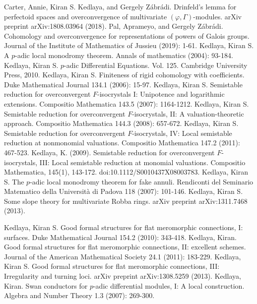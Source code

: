 \documentclass[12pt]{amsart}
\theoremstyle{definition}
\numberwithin{equation}{section}
\begin{document}
\newpage








\begin{thebibliography}{10}
 Carter, Annie, Kiran S. Kedlaya, and Gergely Z\'abr\'adi. Drinfeld's lemma for perfectoid spaces and overconvergence of multivariate $(\varphi,\Gamma) $-modules. arXiv preprint arXiv:1808.03964 (2018).
 Pal, Aprameyo, and Gergely Z\'abr\'adi. Cohomology and overconvergence for representations of powers of Galois groups. Journal of the Institute of Mathematics of Jussieu (2019): 1-61.
 Kedlaya, Kiran S. A $p$-adic local monodromy theorem. Annals of mathematics (2004): 93-184.
 Kedlaya, Kiran S. $p$-adic Differential Equations. Vol. 125. Cambridge University Press, 2010.
 Kedlaya, Kiran S. Finiteness of rigid cohomology with coefficients. Duke Mathematical Journal 134.1 (2006): 15-97.
 Kedlaya, Kiran S. Semistable reduction for overconvergent $F$-isocrystals I: Unipotence and logarithmic extensions. Compositio Mathematica 143.5 (2007): 1164-1212.
 Kedlaya, Kiran S. Semistable reduction for overconvergent $F$-isocrystals, II: A valuation-theoretic approach. Compositio Mathematica 144.3 (2008): 657-672.
 Kedlaya, Kiran S. Semistable reduction for overconvergent $F$-isocrystals, IV: Local semistable reduction at nonmonomial valuations. Compositio Mathematica 147.2 (2011): 467-523.
 Kedlaya, K. (2009). Semistable reduction for overconvergent $F$-isocrystals, III: Local semistable reduction at monomial valuations. Compositio Mathematica, 145(1), 143-172. doi:10.1112/S0010437X08003783.
 Kedlaya, Kiran S. The $p$-adic local monodromy theorem for fake annuli. Rendiconti del Seminario Matematico della Universit\`a di Padova 118 (2007): 101-146.
 Kedlaya, Kiran S. Some slope theory for multivariate Robba rings. arXiv preprint arXiv:1311.7468 (2013).

 Kedlaya, Kiran S. Good formal structures for flat meromorphic connections, I: surfaces. Duke Mathematical Journal 154.2 (2010): 343-418.
 Kedlaya, Kiran. Good formal structures for flat meromorphic connections, II: excellent schemes. Journal of the American Mathematical Society 24.1 (2011): 183-229.
 Kedlaya, Kiran S. Good formal structures for flat meromorphic connections, III: Irregularity and turning loci. arXiv preprint arXiv:1308.5259 (2013).
 Kedlaya, Kiran. Swan conductors for $p$-adic differential modules, I: A local construction. Algebra and Number Theory 1.3 (2007): 269-300.


\end{thebibliography}
\end{document}
